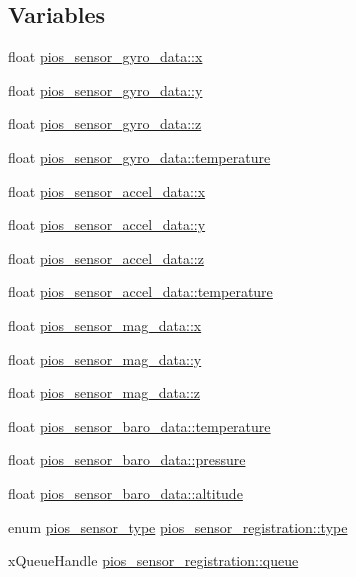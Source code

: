 \subsection*{\-Variables}
\begin{DoxyCompactItemize}
\item 
float \hyperlink{group___p_i_o_s___s_e_n_s_o_r_s_gaa3675ec6a2d0ed4f805311fef19c0c8b}{pios\-\_\-sensor\-\_\-gyro\-\_\-data\-::x}
\item 
float \hyperlink{group___p_i_o_s___s_e_n_s_o_r_s_gaad82a3c1fcca51db61c84eb792d19842}{pios\-\_\-sensor\-\_\-gyro\-\_\-data\-::y}
\item 
float \hyperlink{group___p_i_o_s___s_e_n_s_o_r_s_ga54e998de17a4da6aa1f8504cce31a31c}{pios\-\_\-sensor\-\_\-gyro\-\_\-data\-::z}
\item 
float \hyperlink{group___p_i_o_s___s_e_n_s_o_r_s_ga9f44abb5eea58728c07c17a58155f6e8}{pios\-\_\-sensor\-\_\-gyro\-\_\-data\-::temperature}
\item 
float \hyperlink{group___p_i_o_s___s_e_n_s_o_r_s_gae32485cbb3023e21caf5ac1fd8378fb3}{pios\-\_\-sensor\-\_\-accel\-\_\-data\-::x}
\item 
float \hyperlink{group___p_i_o_s___s_e_n_s_o_r_s_ga9f94596a8b62bafbbbd58e9196347e82}{pios\-\_\-sensor\-\_\-accel\-\_\-data\-::y}
\item 
float \hyperlink{group___p_i_o_s___s_e_n_s_o_r_s_ga8d801598e8a0f5aade459361b3ec9b7a}{pios\-\_\-sensor\-\_\-accel\-\_\-data\-::z}
\item 
float \hyperlink{group___p_i_o_s___s_e_n_s_o_r_s_gadb57b0d1050bd04870c0ad76832f4287}{pios\-\_\-sensor\-\_\-accel\-\_\-data\-::temperature}
\item 
float \hyperlink{group___p_i_o_s___s_e_n_s_o_r_s_ga3ec7375b9b8c7ab5ddd50349c76ac818}{pios\-\_\-sensor\-\_\-mag\-\_\-data\-::x}
\item 
float \hyperlink{group___p_i_o_s___s_e_n_s_o_r_s_ga04a14fcd48fda39a469229e1b01c0b2d}{pios\-\_\-sensor\-\_\-mag\-\_\-data\-::y}
\item 
float \hyperlink{group___p_i_o_s___s_e_n_s_o_r_s_ga77b8adea9b5e8b43c3ce7d4c60784862}{pios\-\_\-sensor\-\_\-mag\-\_\-data\-::z}
\item 
float \hyperlink{group___p_i_o_s___s_e_n_s_o_r_s_ga9cb0c320301d3a8028859d3bf920669f}{pios\-\_\-sensor\-\_\-baro\-\_\-data\-::temperature}
\item 
float \hyperlink{group___p_i_o_s___s_e_n_s_o_r_s_ga43ba219138a0c31669a1af1b45f7a7f6}{pios\-\_\-sensor\-\_\-baro\-\_\-data\-::pressure}
\item 
float \hyperlink{group___p_i_o_s___s_e_n_s_o_r_s_ga36e1ee62fc132c0b2c992ef8efc5bb81}{pios\-\_\-sensor\-\_\-baro\-\_\-data\-::altitude}
\item 
enum \hyperlink{group___p_i_o_s___s_e_n_s_o_r_s_gadad1b67d985a6c9c150a70d23aac96a0}{pios\-\_\-sensor\-\_\-type} \hyperlink{group___p_i_o_s___s_e_n_s_o_r_s_gaf66f51be389998d910c8e9d3fc826a75}{pios\-\_\-sensor\-\_\-registration\-::type}
\item 
x\-Queue\-Handle \hyperlink{group___p_i_o_s___s_e_n_s_o_r_s_gaeea1102e8510b8a5f3bb0cf298e7ebea}{pios\-\_\-sensor\-\_\-registration\-::queue}
\end{DoxyCompactItemize}


